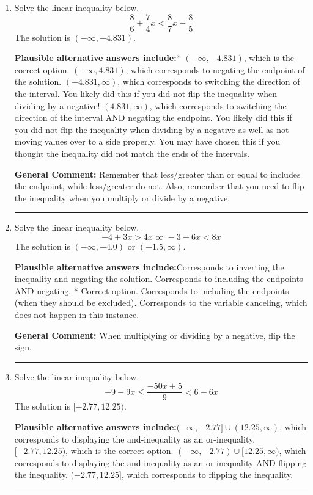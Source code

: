 \documentclass{extbook}[14pt]
\newcommand{\litem}[1]{\item #1

\rule{\textwidth}{0.4pt}}
\begin{document}
\begin{enumerate}
{\textbf{General Comment:} Remember that less/greater than or equal to includes the endpoint, while less/greater do not. Also, remember that you need to flip the inequality when you multiply or divide by a negative.
}
\litem{
Solve the linear inequality below.
\[ \frac{8}{6} + \frac{7}{4} x < \frac{8}{7} x - \frac{8}{5} \]The solution is \( (-\infty, -4.831) \).\begin{enumerate}[label=\Alph*.]
\textbf{Plausible alternative answers include:}* $(-\infty, -4.831)$, which is the correct option.
 $(-\infty, 4.831)$, which corresponds to negating the endpoint of the solution.
 $(-4.831, \infty)$, which corresponds to switching the direction of the interval. You likely did this if you did not flip the inequality when dividing by a negative!
 $(4.831, \infty)$, which corresponds to switching the direction of the interval AND negating the endpoint. You likely did this if you did not flip the inequality when dividing by a negative as well as not moving values over to a side properly.
You may have chosen this if you thought the inequality did not match the ends of the intervals.
\end{enumerate}

\textbf{General Comment:} Remember that less/greater than or equal to includes the endpoint, while less/greater do not. Also, remember that you need to flip the inequality when you multiply or divide by a negative.
}
\litem{
Solve the linear inequality below.
\[ -4 + 3 x > 4 x \text{ or } -3 + 6 x < 8 x \]The solution is \( (-\infty, -4.0) \text{ or } (-1.5, \infty) \).\begin{enumerate}[label=\Alph*.]
\textbf{Plausible alternative answers include:}Corresponds to inverting the inequality and negating the solution.
Corresponds to including the endpoints AND negating.
 * Correct option.
Corresponds to including the endpoints (when they should be excluded).
Corresponds to the variable canceling, which does not happen in this instance.
\end{enumerate}

\textbf{General Comment:} When multiplying or dividing by a negative, flip the sign.
}
\litem{
Solve the linear inequality below.
\[ -9 - 9 x \leq \frac{-50 x + 5}{9} < 6 - 6 x \]The solution is \( [-2.77, 12.25) \).\begin{enumerate}[label=\Alph*.]
\textbf{Plausible alternative answers include:}$(-\infty, -2.77] \cup (12.25, \infty)$, which corresponds to displaying the and-inequality as an or-inequality.
$[-2.77, 12.25)$, which is the correct option.
$(-\infty, -2.77) \cup [12.25, \infty)$, which corresponds to displaying the and-inequality as an or-inequality AND flipping the inequality.
$(-2.77, 12.25]$, which corresponds to flipping the inequality.


\end{enumerate}}
\end{enumerate}
\end{document}
